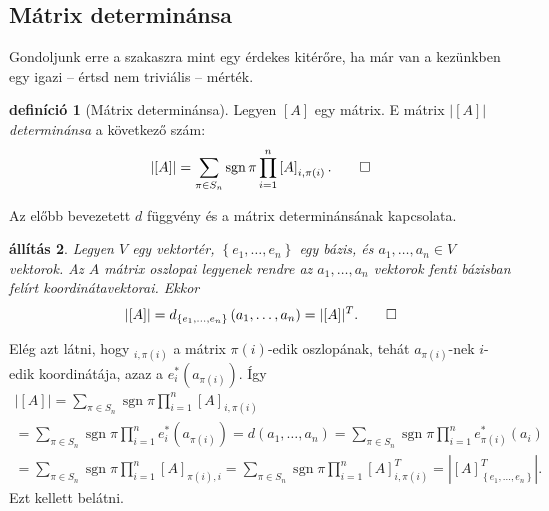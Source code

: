 \documentclass[9pt, a4paper, showtrims]{memoir}
\makeatletter
\renewenvironment{proof}[1][\proofname]
    {\par\pushQED{\qed}%
    \normalfont \topsep6\p@\@plus6\p@\relax
    \trivlist
    \item[\hskip\labelsep
        \itshape
    #1\@addpunct{:}]\ignorespaces}
    {\popQED\endtrivlist\@endpefalse}
\theoremstyle{plain}
\newtheorem{proposition}{állítás}[chapter]
\theoremstyle{remark}
\theoremstyle{definition}
\newtheorem{definition}[proposition]{definíció}
\DeclareMathOperator{\sgn}{sgn}
\makeatother
\begin{document}
\subsection{Mátrix determinánsa}
Gondoljunk erre a szakaszra mint egy érdekes kitérőre, 
ha már van a kezünkben egy igazi -- értsd nem triviális -- mérték.
\begin{definition}[Mátrix determinánsa]
    Legyen 
    $\left[ A\right]$ egy mátrix.
    E mátrix $\left| \left[ A\right] \right|$ \emph{determinánsa} a következő szám:
    \[
    \left| \left[ A\right] \right| 
    =
    \sum_{\pi \in S_{n}}\sgn\pi\prod_{i=1}^n\left[ A\right]_{i,\pi \left( i\right) }.\qedhere
    \]
\end{definition}
Az előbb bevezetett $d$ függvény és a mátrix determinánsának kapcsolata.
\begin{proposition}
    Legyen $V$ egy vektortér,  $\left\{ e_1,\dots,e_n \right\}$ egy bázis,
    és $a_1,\dots,a_n\in V$ vektorok.
    Az $A$ mátrix oszlopai legyenek rendre az 
    $a_1,\dots,a_n$ vektorok fenti bázisban felírt koordinátavektorai.
    Ekkor
    \[
        |[A]|
        =
        d_{\left\{e_1,\dots,e_n \right\}}\left( a_1,\dots,a_n \right)
        =
        |[A]|^T.\qedhere
    \]
\end{proposition}
\begin{proof}
    Elég azt látni, hogy 
    \begin{math}
        [A]_{i,\pi(i)}
    \end{math}
    a mátrix $\pi(i)$-edik oszlopának, tehát $a_{\pi(i)}$-nek $i$-edik koordinátája, azaz 
    a
    \begin{math}
        e_i^\ast\left( a_{\pi(i)} \right).
    \end{math}
    Így 
    \begin{multline*}
        |[A]|
        =
        \sum_{\pi \in S_{n}}\sgn\pi\prod_{i=1}^n\left[ A\right]_{i,\pi \left( i\right) }
        \\
        =
        \sum_{\pi \in S_{n}}\sgn\pi\prod_{i=1}^ne_i^\ast\left( a_{\pi(i)} \right)
        =
        d\left( a_1,\dots,a_n \right)
        =
        \sum_{\pi \in S_{n}}\sgn\pi\prod_{i=1}^ne_{\pi(i)}^\ast\left( a_i \right)
        \\
        =
        \sum_{\pi \in S_{n}}\sgn\pi\prod_{i=1}^n\left[ A\right]_{\pi \left( i\right),i }
        =
        \sum_{\pi \in S_{n}}\sgn\pi\prod_{i=1}^n\left[ A\right]^T_{i,\pi \left( i\right)}
        =
        |[A]^T_{\left\{e_1,\dots,e_n \right\}}|.
    \end{multline*}
    Ezt kellett belátni. 
\end{proof}
\end{document}
